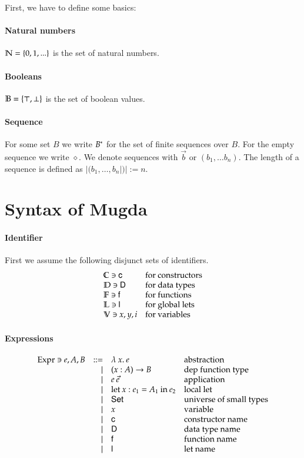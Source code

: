 \noindent First, we have to define some basics:
\paragraph*{Natural numbers}
$ \mathbb{N} = \{ 0 , 1 , ... \} $ is the set of natural numbers.
\paragraph*{Booleans}
$ \mathbb{B} = \{ \top, \bot \} $ is the set of boolean values.
\paragraph*{Sequence}
For some set $B$ we write ${B}^{\ast}$ for the set of finite sequences over $B$.
For the empty sequence we write $\diamond$.
We denote sequences with $\vec{b}$ or $(b_1, \ldots b_n)$.
The length of a sequence is defined as $|(b_1,\ldots, b_n|)| := n $. 
\section{Syntax of Mugda}

\paragraph*{Identifier}
First we assume the following disjunct sets of identifiers.
\[
\begin{array}{ll}
\mathbb{C} \ni \mathsf{c} & \mbox{for constructors}\\
\mathbb{D} \ni \mathsf{D} & \mbox{for data types}\\
\mathbb{F} \ni \mathsf{f} & \mbox{for functions}\\
\mathbb{L} \ni \mathsf{l} & \mbox{for global lets}\\
\mathbb{V} \ni x,y,i & \mbox{for variables}
\end{array}
\]

\paragraph*{Expressions}
\[
\begin{array}{lrll}
\mathrm{Expr} \ni e,A,B & ::= & \lambda\: x .\:{e} & \mbox{abstraction}\\
& \mid & ( x : A ) \rightarrow{B} & \mbox{dep function type}\\
& \mid & e \: \vec{e} & \mbox{application}\\
& \mid & \mathrm{let}\: x : e_1 = A_1 \: \mathrm{in}\:{e_2} & \mbox{local let}\\ 
& \mid & \mathsf{Set} & \mbox{universe of small types}\\
& \mid & x & \mbox{variable}\\
& \mid & \mathsf{c} & \mbox{constructor name}\\
& \mid & \mathsf{D} & \mbox{data type name}\\
& \mid & \mathsf{f} & \mbox{function name}\\
& \mid & \mathsf{l} & \mbox{let name}
\end{array}
\]

